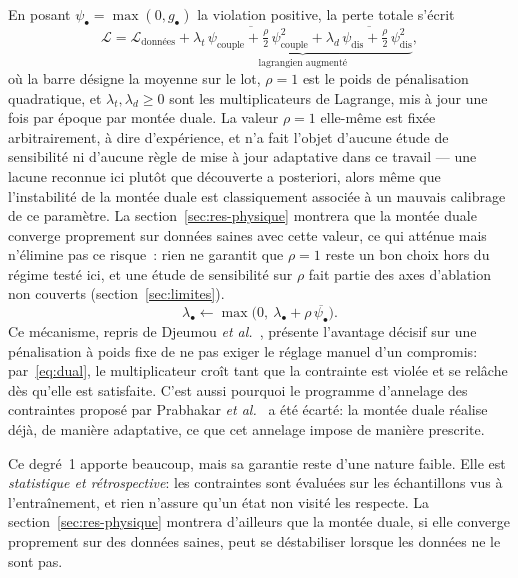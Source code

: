 \documentclass[a4paper, oneside]{article}
\begin{document}
En posant $\psi_\bullet = \max(0, g_\bullet)$ la violation positive, la perte
totale s'écrit
%
\begin{equation}
    \mathcal{L}
    = \mathcal{L}_{\text{données}}
    + \underbrace{\overline{\lambda_{t}\,\psi_{\mathrm{couple}}
      + \tfrac{\rho}{2}\,\psi_{\mathrm{couple}}^{2}}
    + \overline{\lambda_{d}\,\psi_{\mathrm{dis}}
      + \tfrac{\rho}{2}\,\psi_{\mathrm{dis}}^{2}}}
      _{\text{lagrangien augmenté}} ,
    \label{eq:Ltotal}
\end{equation}
%
où la barre désigne la moyenne sur le lot, $\rho = 1$ est le poids de
pénalisation quadratique, et $\lambda_{t}, \lambda_{d} \ge 0$ sont les
multiplicateurs de Lagrange, mis à jour une fois par époque par montée duale.
La valeur $\rho = 1$ elle-même est fixée arbitrairement, à dire d'expérience,
et n'a fait l'objet d'aucune étude de sensibilité ni d'aucune règle de mise à
jour adaptative dans ce travail — une lacune reconnue ici plutôt que
découverte a posteriori, alors même que l'instabilité de la montée duale est
classiquement associée à un mauvais calibrage de ce paramètre. La
section~\ref{sec:res-physique} montrera que la montée duale converge
proprement sur données saines avec cette valeur, ce qui atténue mais
n'élimine pas ce risque~: rien ne garantit que $\rho = 1$ reste un bon choix
hors du régime testé ici, et une étude de sensibilité sur $\rho$ fait partie
des axes d'ablation non couverts (section~\ref{sec:limites}).
%
\begin{equation}
    \lambda_\bullet \leftarrow \max\bigl(0,\ \lambda_\bullet
    + \rho\,\overline{\psi_\bullet}\bigr) .
    \label{eq:dual}
\end{equation}
%
Ce mécanisme, repris de Djeumou \emph{et al.}~\cite{djeumou2022}, présente
l'avantage décisif sur une pénalisation à poids fixe de ne pas exiger le réglage
manuel d'un compromis: par~\eqref{eq:dual}, le multiplicateur croît tant que la
contrainte est violée et se relâche dès qu'elle est satisfaite. C'est aussi
pourquoi le
programme d'annelage des contraintes proposé par
Prabhakar \emph{et al.}~\cite{prabhakar2026} a été écarté: la montée duale
réalise déjà, de manière adaptative, ce que cet annelage impose de manière
prescrite.

Ce degré~1 apporte beaucoup, mais sa garantie reste d'une nature faible. Elle
est \emph{statistique et rétrospective}: les contraintes sont évaluées sur les
échantillons vus à l'entraînement, et rien n'assure qu'un état non visité les
respecte. La section~\ref{sec:res-physique} montrera d'ailleurs que la montée
duale, si elle converge proprement sur des données saines, peut se déstabiliser
lorsque les données ne le sont pas.
\end{document}
